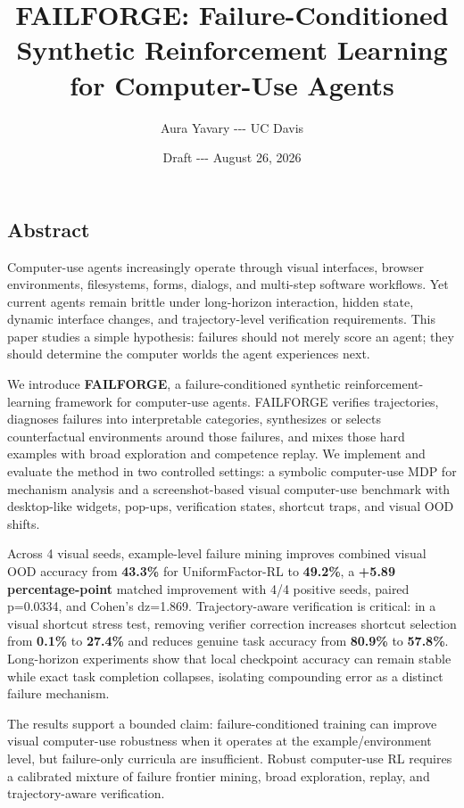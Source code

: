 \documentclass[
]{article}
\title{FAILFORGE: Failure-Conditioned Synthetic Reinforcement Learning
for Computer-Use Agents}
\author{Aura Yavary -\/-\/- UC Davis}
\date{Draft -\/-\/- August 26, 2026}
\begin{document}
\maketitle

\subsection{Abstract}\label{abstract}

Computer-use agents increasingly operate through visual interfaces,
browser environments, filesystems, forms, dialogs, and multi-step
software workflows. Yet current agents remain brittle under long-horizon
interaction, hidden state, dynamic interface changes, and
trajectory-level verification requirements. This paper studies a simple
hypothesis: failures should not merely score an agent; they should
determine the computer worlds the agent experiences next.

We introduce \textbf{FAILFORGE}, a failure-conditioned synthetic
reinforcement-learning framework for computer-use agents. FAILFORGE
verifies trajectories, diagnoses failures into interpretable categories,
synthesizes or selects counterfactual environments around those
failures, and mixes those hard examples with broad exploration and
competence replay. We implement and evaluate the method in two
controlled settings: a symbolic computer-use MDP for mechanism analysis
and a screenshot-based visual computer-use benchmark with desktop-like
widgets, pop-ups, verification states, shortcut traps, and visual OOD
shifts.

Across 4 visual seeds, example-level failure mining improves combined
visual OOD accuracy from \textbf{43.3\%} for UniformFactor-RL to
\textbf{49.2\%}, a \textbf{+5.89 percentage-point} matched improvement
with 4/4 positive seeds, paired p=0.0334, and Cohen's dz=1.869.
Trajectory-aware verification is critical: in a visual shortcut stress
test, removing verifier correction increases shortcut selection from
\textbf{0.1\%} to \textbf{27.4\%} and reduces genuine task accuracy from
\textbf{80.9\%} to \textbf{57.8\%}. Long-horizon experiments show that
local checkpoint accuracy can remain stable while exact task completion
collapses, isolating compounding error as a distinct failure mechanism.

The results support a bounded claim: failure-conditioned training can
improve visual computer-use robustness when it operates at the
example/environment level, but failure-only curricula are insufficient.
Robust computer-use RL requires a calibrated mixture of failure frontier
mining, broad exploration, replay, and trajectory-aware verification.
\end{document}
